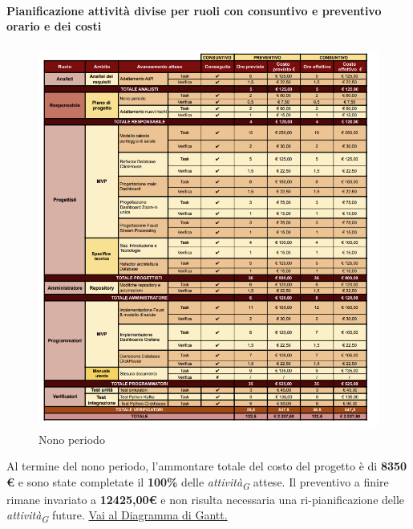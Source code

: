 \paragraph{Pianificazione attività divise per ruoli con consuntivo e preventivo orario e dei costi}

\vspace{0.4cm}

\begin{figure}[H]
    \centering
    \includegraphics[height=1.1\textwidth]{../Images/tabG9.PNG}
    \caption{Nono periodo}
    \label{fig:Nono_periodo}
\end{figure}

Al termine del nono periodo, l'ammontare totale del costo del progetto è di \textbf{8350 \euro} e sono state completate il \textbf{100\%} delle \textit{attività}\textsubscript{\textit{G}} attese.
Il preventivo a finire rimane invariato a \textbf{12425,00\euro} e non risulta necessaria una ri-pianificazione delle \textit{attività}\textsubscript{\textit{G}} future.
\href{https://github.com/orgs/ByteOps-swe/projects/3/views/1?sortedBy%5Bdirection%5D=asc&sortedBy%5BcolumnId%5D=64182560}{Vai al Diagramma di Gantt.}

